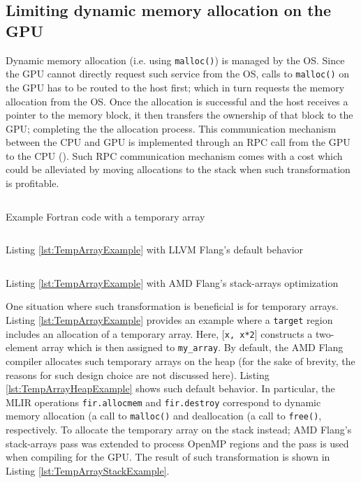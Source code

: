 \documentclass[acmtog,natbib=false]{acmart}
\newcommand{\code}[1]{\texttt{#1}\xspace}
\begin{document}
\subsection{Limiting dynamic memory allocation on the GPU}
Dynamic memory allocation (i.e. using \code{malloc()}) is managed by the \ac{OS}.
Since the GPU cannot directly request such service from the \ac{OS}, calls to \code{malloc()} on the GPU has to be routed to the host first; which in turn requests the memory allocation from the \ac{OS}.
Once the allocation is successful and the host receives a pointer to the memory block, it then transfers the ownership of that block to the GPU; completing the the allocation process.
This communication mechanism between the CPU and GPU is implemented through an \ac{RPC} call from the GPU to the CPU (\cite{gpulibc}).
Such \ac{RPC} communication mechanism comes with a cost which could be alleviated by moving allocations to the stack when such transformation is profitable.

\begin{listing}[t]
\inputminted{Fortran}{code/temp_array.f90}
\caption{Example Fortran code with a temporary array}
\label{lst:TempArrayExample}
\end{listing}

\begin{listing}[t]
\inputminted{Fortran}{code/temp_array_heap.mlir}
\caption{Listing \ref{lst:TempArrayExample} with LLVM Flang's default behavior}
\label{lst:TempArrayHeapExample}
\end{listing}

\begin{listing}[t]
\inputminted{Fortran}{code/temp_array_stack.mlir}
\caption{Listing \ref{lst:TempArrayExample} with AMD Flang's stack-arrays optimization}
\label{lst:TempArrayStackExample}
\end{listing}

One situation where such transformation is beneficial is for temporary arrays.
Listing \ref{lst:TempArrayExample} provides an example where a \code{target} region includes an allocation of a temporary array.
Here, [\code{x, x*2}] constructs a two-element array which is then assigned to \code{my\_array}.
By default, the AMD Flang compiler allocates such temporary arrays on the heap (for the sake of brevity, the reasons for such design choice are not discussed here).
Listing \ref{lst:TempArrayHeapExample} shows such default behavior.
In particular, the MLIR operations \code{fir.allocmem} and \code{fir.destroy} correspond to dynamic memory allocation (a call to \code{malloc()} and deallocation (a call to \code{free()}, respectively.
To allocate the temporary array on the stack instead; AMD Flang's stack-arrays pass was extended to process OpenMP regions and the pass is used when compiling for the GPU.
The result of such transformation is shown in Listing \ref{lst:TempArrayStackExample}.
\end{document}
